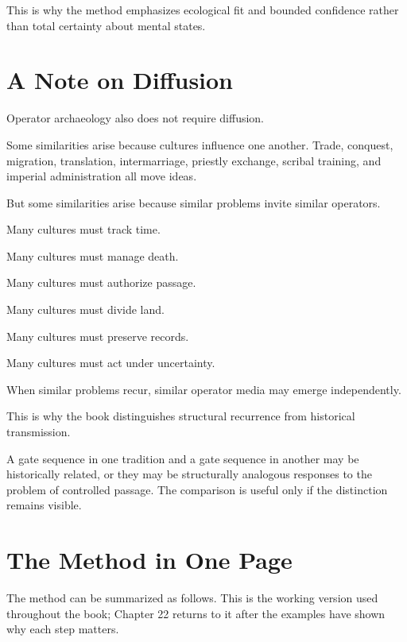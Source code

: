 \documentclass[11pt]{book}
\begin{document}
This is why the method emphasizes ecological fit and bounded confidence rather than total certainty about mental states.

\section{A Note on Diffusion}

Operator archaeology also does not require diffusion.

Some similarities arise because cultures influence one another. Trade, conquest, migration, translation, intermarriage, priestly exchange, scribal training, and imperial administration all move ideas.

But some similarities arise because similar problems invite similar operators.

Many cultures must track time.

Many cultures must manage death.

Many cultures must authorize passage.

Many cultures must divide land.

Many cultures must preserve records.

Many cultures must act under uncertainty.

When similar problems recur, similar operator media may emerge independently.

This is why the book distinguishes structural recurrence from historical transmission.

A gate sequence in one tradition and a gate sequence in another may be historically related, or they may be structurally analogous responses to the problem of controlled passage. The comparison is useful only if the distinction remains visible.

\section{The Method in One Page}

The method can be summarized as follows. This is the working version used throughout the book; Chapter 22 returns to it after the examples have shown why each step matters.
\end{document}
